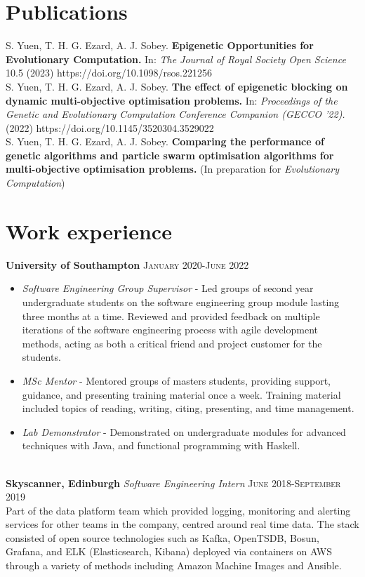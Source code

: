 \documentclass{article}
\begin{document}
\section*{Publications}
S. Yuen, T. H. G. Ezard, A. J. Sobey.
\textbf{Epigenetic Opportunities for Evolutionary Computation.} 
In: \textit{The Journal of Royal Society Open Science} 10.5 (2023) 
https://doi.org/10.1098/rsos.221256
\\

S. Yuen, T. H. G. Ezard, A. J. Sobey.
\textbf{The effect of epigenetic blocking on dynamic multi-objective optimisation problems.} 
In: \textit{Proceedings of the Genetic and Evolutionary Computation Conference Companion 
(GECCO ’22).} (2022)
https://doi.org/10.1145/3520304.3529022
\\

S. Yuen, T. H. G. Ezard, A. J. Sobey. \textbf{Comparing the performance of
  genetic algorithms and particle swarm optimisation algorithms for
  multi-objective optimisation problems.}
  (In preparation for \textit{Evolutionary Computation})


\section*{Work experience}
\textbf{University of Southampton} \hfill \textsc{January 2020-June 2022}
\begin{itemize}
    \item \textit{Software Engineering Group Supervisor} - Led groups of
    second year undergraduate students on the software engineering group module lasting
    three months at a time. Reviewed and provided feedback on multiple iterations
    of the software engineering process with agile development methods, acting as
    both a critical friend and project customer for the students.
    \item \textit{MSc Mentor} - Mentored groups of masters students,
    providing support, guidance, and presenting training material once a week. Training material
    included topics of reading, writing, citing, presenting, and time management.
    \item \textit{Lab Demonstrator} - Demonstrated on undergraduate modules
    for advanced techniques with Java, and functional programming with Haskell.
\end{itemize}
\ \\
\textbf{Skyscanner, Edinburgh} \textit{Software Engineering Intern}
\hfill
\textsc{June 2018-September 2019} \\
Part of the data platform team which provided logging, monitoring and alerting services for
other teams in the company, centred around real time data. The stack consisted of open source
technologies such as Kafka, OpenTSDB, Bosun, Grafana, and ELK (Elasticsearch, Kibana)
deployed via containers on AWS
through a variety of methods including Amazon Machine Images and Ansible.
\newline
\end{document}
